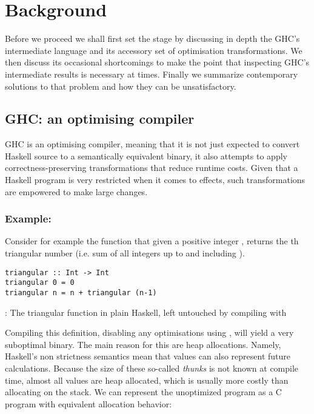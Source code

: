 \chapter{Background}

Before we proceed we shall first set the stage by discussing in depth the GHC's intermediate language and its
accessory set of optimisation transformations. We then discuss its occasional shortcomings to make the point that
inspecting GHC's intermediate results is necessary at times. 
Finally we summarize contemporary solutions to that problem and how they can be unsatisfactory.

\section{GHC: an optimising compiler}

GHC is an optimising compiler, meaning that it is not just expected to convert Haskell source to a semantically equivalent binary,
it also attempts to apply correctness-preserving transformations that reduce runtime costs. Given that a Haskell program is very
restricted when it comes to effects, such transformations are empowered to make large changes.

\subsection{Example: }
Consider for example the function that given a positive integer , returns the th triangular number (i.e. sum of all integers up to and including ).

\begin{listing}[H]
\begin{verbatim}
triangular :: Int -> Int
triangular 0 = 0
triangular n = n + triangular (n-1)
\end{verbatim}
\caption{: The triangular function in plain Haskell, left untouched by compiling with }
\end{listing}

Compiling this definition, disabling any optimisations using , will yield a very suboptimal binary. The main
reason for this are heap allocations. Namely, Haskell's non strictness semantics mean that values can also represent
future calculations. Because the size of these so-called \textit{thunks} is not known at compile time, almost all
values are heap allocated, which is usually more costly than allocating on the stack. We can represent the
unoptimized  program as a C program with equivalent allocation behavior:

